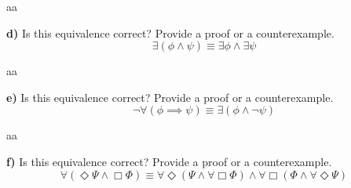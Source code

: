 \documentclass[titlepage, letterpaper, fleqn]{article}
\begin{document}
aa

{\large \textbf{d)} Is this equivalence correct? Provide a proof or a counterexample.
\[\exists (\phi \wedge \psi) \equiv \exists \phi \wedge \exists \psi\]}

aa

{\large \textbf{e)} Is this equivalence correct? Provide a proof or a counterexample.
\[\neg \forall(\phi \implies \psi) \equiv \exists (\phi \wedge \neg \psi)\]}

aa

{\large \textbf{f)} Is this equivalence correct? Provide a proof or a counterexample.
\[\forall (\Diamond \Psi \wedge \Box \Phi) \equiv \forall \Diamond (\Psi \wedge \forall \Box \Phi) \wedge \forall \Box (\Phi \wedge \forall \Diamond \Psi)\]}
\end{document}
